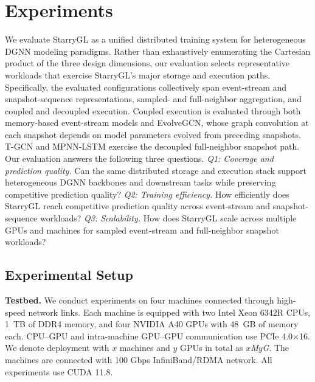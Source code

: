 \section{Experiments}
\label{sec:experiments}
We evaluate StarryGL as a unified distributed training system for heterogeneous DGNN modeling paradigms. Rather than exhaustively enumerating the Cartesian product of the three design dimensions, our evaluation selects representative workloads that exercise StarryGL’s major storage and execution paths. Specifically, the evaluated configurations collectively span event-stream and snapshot-sequence representations, sampled- and full-neighbor aggregation, and coupled and decoupled execution. Coupled execution is evaluated through both memory-based event-stream models and EvolveGCN, whose graph convolution at each snapshot depends on model parameters evolved from preceding snapshots. T-GCN and MPNN-LSTM exercise the decoupled full-neighbor snapshot path.
Our evaluation answers the following three questions. \textit{Q1: Coverage and prediction quality.} Can the same distributed storage and execution stack support heterogeneous DGNN backbones and downstream tasks while preserving competitive prediction quality? \textit{Q2: Training efficiency.} How efficiently does StarryGL reach competitive prediction quality across event-stream and snapshot-sequence workloads? \textit{Q3: Scalability.} How does StarryGL scale across multiple GPUs and machines for sampled event-stream and full-neighbor snapshot workloads?

\subsection{Experimental Setup}
\label{subsec:exp_setup}
\noindent\textbf{Testbed.}
We conduct experiments on four machines connected through
high-speed network links. Each machine is equipped with two Intel
Xeon 6342R CPUs, 1~TB of DDR4 memory, and four NVIDIA A40 GPUs
with 48~GB of memory each. CPU--GPU and intra-machine GPU--GPU
communication use PCIe 4.0$\times$16. We denote deployment with
$x$ machines and $y$ GPUs in total as \textit{$x$M$y$G}. The machines are connected with 100 Gbps InfiniBand/RDMA network. All experiments use CUDA 11.8.

